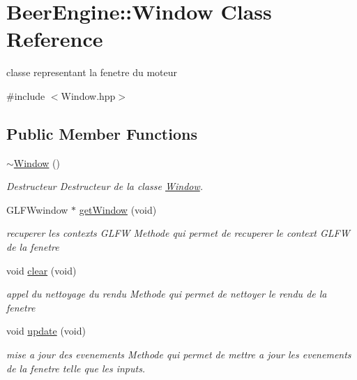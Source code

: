 \hypertarget{class_beer_engine_1_1_window}{}\section{Beer\+Engine\+:\+:Window Class Reference}
\label{class_beer_engine_1_1_window}


classe representant la fenetre du moteur  




{\ttfamily \#include $<$Window.\+hpp$>$}

\subsection*{Public Member Functions}
\begin{DoxyCompactItemize}
\item 
\mbox{\hyperlink{class_beer_engine_1_1_window_a3ae0fe522cf721377047b1027d591d33}{$\sim$\+Window}} ()
\begin{DoxyCompactList}\small\item\em Destructeur Destructeur de la classe \mbox{\hyperlink{class_beer_engine_1_1_window}{Window}}. \end{DoxyCompactList}\item 
G\+L\+F\+Wwindow $\ast$ \mbox{\hyperlink{class_beer_engine_1_1_window_af7a6662e99bb0d07787014adacb8db33}{get\+Window}} (void)
\begin{DoxyCompactList}\small\item\em recuperer les contexts G\+L\+FW Methode qui permet de recuperer le context G\+L\+FW de la fenetre \end{DoxyCompactList}\item 
void \mbox{\hyperlink{class_beer_engine_1_1_window_a7417b4c023c22a9641a1b94cd0cfee93}{clear}} (void)
\begin{DoxyCompactList}\small\item\em appel du nettoyage du rendu Methode qui permet de nettoyer le rendu de la fenetre \end{DoxyCompactList}\item 
void \mbox{\hyperlink{class_beer_engine_1_1_window_abc6524b9b96a88e3427dce738bfe9d4a}{update}} (void)
\begin{DoxyCompactList}\small\item\em mise a jour des evenements Methode qui permet de mettre a jour les evenements de la fenetre telle que les inputs. \end{DoxyCompactList}\item 

\end{DoxyCompactItemize}
